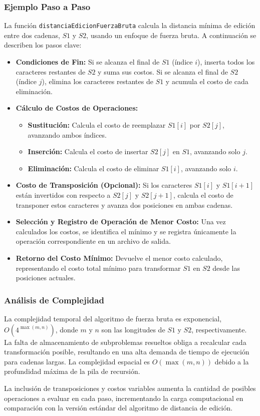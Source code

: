 \subsubsection{Ejemplo Paso a Paso}

La función \texttt{distanciaEdicionFuerzaBruta} calcula la distancia mínima de edición entre dos cadenas, \( S1 \) y \( S2 \), usando un enfoque de fuerza bruta. A continuación se describen los pasos clave:

\begin{itemize}
    \item \textbf{Condiciones de Fin:} Si se alcanza el final de \( S1 \) (índice \( i \)), inserta todos los caracteres restantes de \( S2 \) y suma sus costos. Si se alcanza el final de \( S2 \) (índice \( j \)), elimina los caracteres restantes de \( S1 \) y acumula el costo de cada eliminación.

    \item \textbf{Cálculo de Costos de Operaciones:} 
    \begin{itemize}
        \item \textbf{Sustitución:} Calcula el costo de reemplazar \( S1[i] \) por \( S2[j] \), avanzando ambos índices.
        \item \textbf{Inserción:} Calcula el costo de insertar \( S2[j] \) en \( S1 \), avanzando solo \( j \).
        \item \textbf{Eliminación:} Calcula el costo de eliminar \( S1[i] \), avanzando solo \( i \).
    \end{itemize}

    \item \textbf{Costo de Transposición (Opcional):} Si los caracteres \( S1[i] \) y \( S1[i+1] \) están invertidos con respecto a \( S2[j] \) y \( S2[j+1] \), calcula el costo de transponer estos caracteres y avanza dos posiciones en ambas cadenas.

    \item \textbf{Selección y Registro de Operación de Menor Costo:} Una vez calculados los costos, se identifica el mínimo y se registra únicamente la operación correspondiente en un archivo de salida.

    \item \textbf{Retorno del Costo Mínimo:} Devuelve el menor costo calculado, representando el costo total mínimo para transformar \( S1 \) en \( S2 \) desde las posiciones actuales.
\end{itemize}


\subsubsection{Análisis de Complejidad}
La complejidad temporal del algoritmo de fuerza bruta es exponencial, \( O(4^{\max(m, n)}) \), donde \( m \) y \( n \) son las longitudes de \( S1 \) y \( S2 \), respectivamente. La falta de almacenamiento de subproblemas resueltos obliga a recalcular cada transformación posible, resultando en una alta demanda de tiempo de ejecución para cadenas largas. La complejidad espacial es \( O(\max(m, n)) \) debido a la profundidad máxima de la pila de recursión.

La inclusión de transposiciones y costos variables aumenta la cantidad de posibles operaciones a evaluar en cada paso, incrementando la carga computacional en comparación con la versión estándar del algoritmo de distancia de edición.
